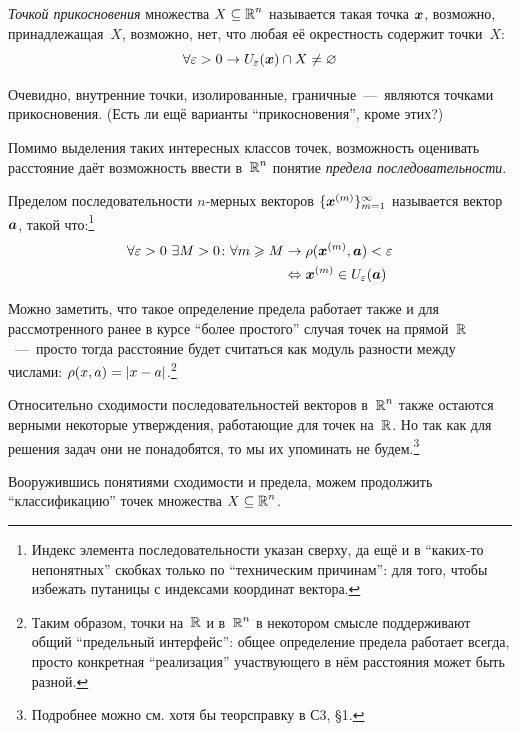 \documentclass[a4paper,12pt]{article}
\begin{document}
  \begin{definition}\label{def:touch-point}
    \emph{Точкой прикосновения} множества $X \subseteq \operatorname{\mathbb R}^n$ называется такая точка $\boldsymbol x$, возможно, принадлежащая~$X$, возможно, нет, что любая её окрестность содержит точки~$X$:
    \[
      \forall \varepsilon > 0 \to U_{\varepsilon}(\boldsymbol x) \cap X \not= \varnothing
    \]
  \end{definition}

  Очевидно, внутренние точки, изолированные, граничные~---~являются точками прикосновения.
  (Есть ли ещё варианты ``прикосновения'', кроме этих?)

  Помимо выделения таких интересных классов точек, возможность оценивать расстояние даёт возможность ввести в~$\operatorname{\mathbb R}^n$ понятие \emph{предела последовательности}.

  Пределом последовательности $n$-мерных векторов $\{\boldsymbol x^{(m)}\}_{m = 1}^\infty$ называется вектор $\boldsymbol a$, такой что:\footnote{
    Индекс элемента последовательности указан сверху, да ещё и в ``каких-то непонятных'' скобках только по ``техническим причинам'': для того, чтобы избежать путаницы с индексами координат вектора.
  }
  \begin{equation}\label{eq:seq-limit}
  \begin{split}
    \forall \varepsilon > 0\ \exists M > 0\colon \forall m \geqslant M &\to \rho(\boldsymbol x^{(m)}, \boldsymbol a) < \varepsilon\\
      &\Leftrightarrow \boldsymbol x^{(m)} \in U_{\varepsilon}(\boldsymbol a)
  \end{split}
  \end{equation}

  Можно заметить, что такое определение предела работает также и для рассмотренного ранее в курсе ``более простого'' случая точек на прямой~$\operatorname{\mathbb R}$~---~просто тогда расстояние будет считаться как модуль разности между числами: $\rho(x, a) \hm= |x - a|$.\footnote{
    Таким образом, точки на~$\operatorname{\mathbb R}$ и в~$\operatorname{\mathbb R}^n$ в некотором смысле поддерживают общий ``предельный интерфейс'': общее определение предела работает всегда, просто конкретная ``реализация'' участвующего в нём расстояния может быть разной.
  }

  Относительно сходимости последовательностей векторов в~$\operatorname{\mathbb R}^n$ также остаются верными некоторые утверждения, работающие для точек на~$\operatorname{\mathbb R}$.
  Но так как для решения задач они не понадобятся, то мы их упоминать не будем.\footnote{
    Подробнее можно см. хотя бы теорсправку в С3, \S 1.
  }

  Вооружившись понятиями сходимости и предела, можем продолжить ``классификацию'' точек множества $X \hm\subseteq \RR^n$.
\end{document}
